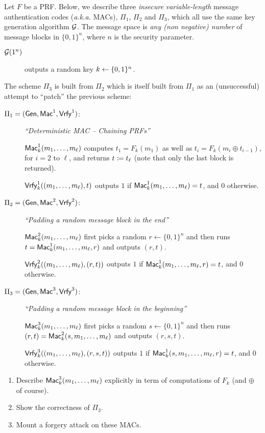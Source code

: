 \documentclass[12pt]{article}
\begin{document}
Let $F$ be a PRF. Below, we describe three \textit{insecure} \emph{variable-length} message authentication codes (\textit{a.k.a.} MACs), $\Pi_1$, $\Pi_2$ and $\Pi_3$, which all use the same key generation algorithm $\mathcal{G}$. The message space is \emph{any (non negative) number} of message blocks in $\{0,1\}^n$, where $n$ is the security parameter.
%
\begin{description}
	\item[$\mathcal{G}(1^n)$] outputs a random key $k\gets\{0, 1\}^n$.
\end{description}
%
The scheme $\Pi_3$ is built from $\Pi_2$ which is itself built from $\Pi_1$ as an (unsuccessful) attempt to ``patch'' the previous scheme:
%
\begin{description}
	\item[$\Pi_1=(\operatorname{\mathsf{Gen}},\operatorname{\mathsf{Mac}}^1,\operatorname{\mathsf{Vrfy}}^1)$:]
	\emph{``Deterministic MAC -- Chaining PRFs''}

	$\operatorname{\mathsf{Mac}}^1_k(m_1,\ldots,m_\ell)$ computes $t_1=F_k(m_1)$ as well as
	$t_i=F_k(m_i\oplus t_{i-1})$, for $i=2$ to $\ell$, and returns $t \coloneqq t_\ell$ (note that only the last block is returned).

	$\operatorname{\mathsf{Vrfy}}^1_k((m_1,\ldots,m_{\ell}),t)$ outputs $1$ if
	$\operatorname{\mathsf{Mac}}^1_k(m_1,\ldots,m_{\ell})=t$, and 0 otherwise.
	\item[$\Pi_2=(\operatorname{\mathsf{Gen}},\operatorname{\mathsf{Mac}}^2,\operatorname{\mathsf{Vrfy}}^2)$:]
	\emph{``Padding a random message block in the end''}

	$\operatorname{\mathsf{Mac}}^2_k(m_1,\ldots,m_\ell)$ first picks a random $r\gets\{0,1\}^n$ and
	then runs $t=\operatorname{\mathsf{Mac}}_k^1(m_1,\ldots,m_\ell,r)$ and outputs $(r,t)$.

	$\operatorname{\mathsf{Vrfy}}^2_k((m_1,\ldots,m_{\ell}),(r,t))$ outputs $1$ if
	$\operatorname{\mathsf{Mac}}^1_k(m_1,\ldots,m_{\ell},r)=t$, and 0 otherwise.

	\item[$\Pi_3=(\operatorname{\mathsf{Gen}},\operatorname{\mathsf{Mac}}^3,\operatorname{\mathsf{Vrfy}}^3)$:]
	\emph{``Padding a random message block in the beginning''}

	$\operatorname{\mathsf{Mac}}^3_k(m_1,\ldots,m_\ell)$ first picks a random $s\gets\{0,1\}^n$ and
	then runs $(r,t)=\operatorname{\mathsf{Mac}}_k^2(s,m_1,\ldots,m_\ell)$ and outputs $(r,s,t)$.

	$\operatorname{\mathsf{Vrfy}}^3_k((m_1,\ldots,m_{\ell}),(r,s,t))$ outputs $1$ if
	$\operatorname{\mathsf{Mac}}^1_k(s,m_1,\ldots,m_{\ell},r)=t$, and 0 otherwise.
\end{description}

\begin{enumerate}
	\item Describe $\operatorname{\mathsf{Mac}}_k^3(m_1,\ldots,m_\ell)$ explicitly in term of computations
	of $F_k$ (and $\oplus$ of course).
	\item Show the correctness of $\Pi_3$.
	\item Mount a forgery attack on these MACs.
\end{enumerate}
\end{document}
